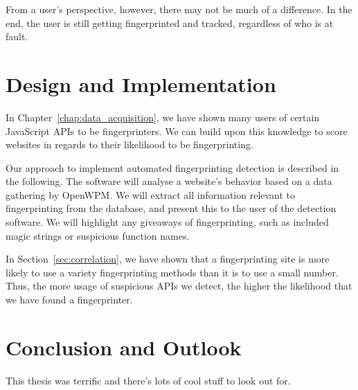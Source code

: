 \documentclass[
    fontsize=12pt,
    headings=small,
    parskip=half,
    bibliography=totoc,
    numbers=noenddot,
    open=any
    ]{scrreprt}
\begin{document}
From a user's perspective, however, there may not be much of a difference.
In the end, the user is still getting fingerprinted and tracked, regardless
of who is at fault.




\chapter{Design and Implementation}
In Chapter~\ref{chap:data_acquisition}, we have shown many users of certain JavaScript APIs to be fingerprinters.
We can build upon this knowledge to score websites in regards to their likelihood to be fingerprinting.

Our approach to implement automated fingerprinting detection is described in the following.
The software will analyse a website's behavior based on a data gathering by OpenWPM.
We will extract all information relevant to fingerprinting from the database,
and present this to the user of the detection software.
We will highlight any giveaways of fingerprinting, such as included magic strings
or suspicious function names.

In Section~\ref{sec:correlation}, we have shown that a fingerprinting site is more
likely to use a variety fingerprinting methods than it is to use a small number.
Thus, the more usage of suspicious APIs we detect, the higher the likelihood
that we have found a fingerprinter.


\chapter{Conclusion and Outlook}
This thesis was terrific and there's lots of cool stuff to look out for.
\end{document}
